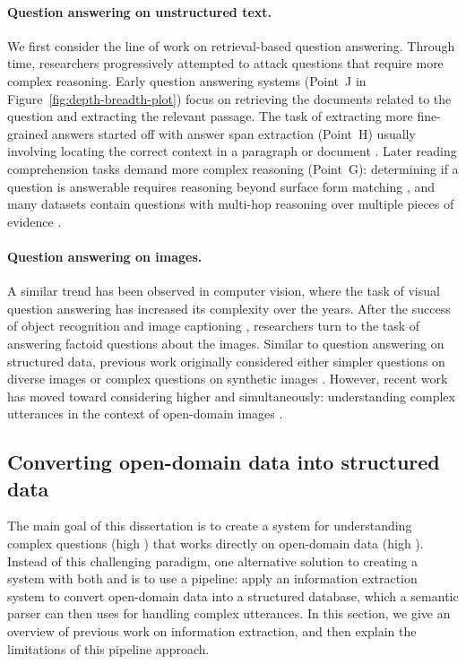 \paragraph{Question answering on unstructured text.}
We first consider the line of work on retrieval-based question answering.
Through time,
researchers progressively attempted to attack
questions that require more complex reasoning.
Early question answering systems
(Point~J in Figure~\ref{fig:depth-breadth-plot})
focus on retrieving the documents
related to the question
\cite{brill2002askmsr,pasca2003open}
and extracting the relevant passage.
The task of extracting more fine-grained answers
started off with answer span extraction
(Point~H)
usually involving locating the correct context in a paragraph
or document \cite{yang2015wikiqa,rajpurkar2016squad,seo2016bidaf}.
Later reading comprehension tasks
demand more complex reasoning
(Point~G):
determining if a question is answerable
requires reasoning beyond surface form matching
\cite{rajpurkar2018squadrun},
and many datasets contain
questions with multi-hop reasoning over multiple pieces of evidence
\cite{yang2018hotpotqa,dua2019drop}.

\paragraph{Question answering on images.}
A similar trend has been observed
in computer vision,
where the task of visual question answering
has increased its complexity over the years.
After the success of object recognition
\cite{krizhevsky2012imagenet,szegedy2015googlenet,he2016resnet}
and image captioning
\cite{farhadi2010every,lin2014microsoft,fang2015captions,mao2015deep},
researchers turn to the task of answering factoid questions about the images.
Similar to question answering on structured data,
previous work originally considered
either simpler questions on diverse images \cite{antol2015vqa}
or complex questions on synthetic images \cite{johnson2017clevr,suhr2017nlvr}.
However, recent work has moved toward considering
higher \Breadth and \Depth simultaneously:
understanding complex utterances
in the context of open-domain images
\cite{suhr2018situated,hudson2019gqa}.

\subsection{Converting open-domain data into structured data}
\label{sec:intro-ie}

The main goal of this dissertation is to create a system
for understanding complex questions (high \Depth)
that works directly on open-domain data (high \Breadth).
Instead of this challenging paradigm,
one alternative solution to creating a system with both \Breadth
and \Depth is to use a pipeline:
apply an information extraction system to
convert open-domain data into a structured database,
which a semantic parser can then uses for handling complex utterances.
In this section,
we give an overview of previous work on information extraction,
and then explain the limitations of this pipeline approach.

